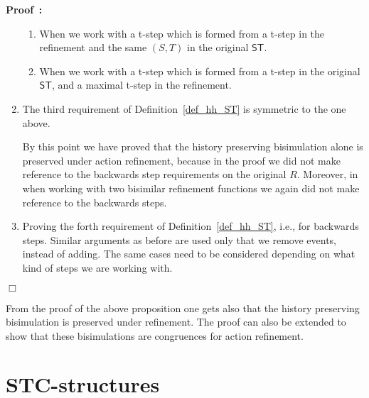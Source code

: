 \documentclass[submission,copyright,creativecommons]{eptcs}
\newtheorem{proposition}[theorem]{Proposition}
\newenvironment{proof}[1][\!\!\,]{\vspace{1ex}\noindent\textbf{Proof #1: }}{\hfill$\Box$\vspace{2ex}}
\newcommand{\cp}[1]{}
\newcounter{case}
\newcommand\HDAs{\ensuremath{\mathit{HDAs}}}
\newcommand\ST{\ensuremath{\mathsf{ST}}}
\begin{document}
\begin{proof}
\begin{enumerate}
\begin{enumerate}
\item When we work with a t-step which is formed from a t-step in the refinement and the same $(S,T)$ in the original \ST.

\item When we work with a t-step which is formed from a t-step in the original \ST, and a maximal t-step in the refinement.
\end{enumerate}

\item The third requirement of Definition~\ref{def_hh_ST} is symmetric to the one above.

\vspace{1ex}By this point we have proved that the history preserving bisimulation alone is preserved under action refinement, because in the proof we did not make reference to the backwards step requirements on the original $R$. Moreover, in when working with two bisimilar refinement functions we again did not make reference to the backwards steps.

\item Proving the forth requirement of Definition~\ref{def_hh_ST}, i.e., for backwards steps.
Similar arguments as before are used only that we remove events, instead of adding. The same cases need to be considered depending on what kind of steps we are working with.
\end{enumerate}
\end{proof}

From the proof of the above proposition one gets also that the history preserving bisimulation is preserved under refinement. The proof can also be extended to show that these bisimulations are congruences for action refinement.


\cp{
\begin{proposition}
ST-trace equivalence and cc-equivalence are preserved under action refinement.
\end{proposition}

\begin{proposition}
Action refinement for higher dimensional automata is defined by replacing transitions by new \HDAs. This result should be deducible from the refinement on adjacent-closed ST-structures.
\end{proposition}
}


\section{STC-structures}\label{sec_STCstruct}
\end{document}
